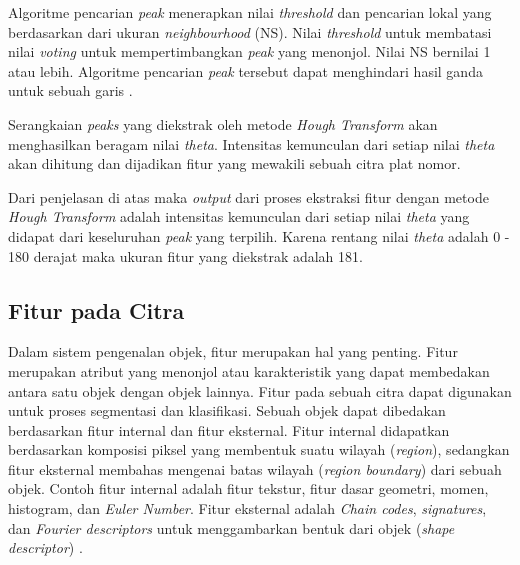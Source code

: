 \noindent Algoritme pencarian \textit{peak} menerapkan nilai \textit{threshold} dan pencarian lokal yang berdasarkan dari ukuran \textit{neighbourhood} (NS). Nilai \textit{threshold} untuk membatasi nilai \textit{voting} untuk mempertimbangkan \textit{peak} yang menonjol. Nilai NS bernilai 1 atau lebih. Algoritme pencarian \textit{peak} tersebut dapat menghindari hasil ganda untuk sebuah garis \cite{oechsle}.

\noindent Serangkaian \textit{peaks} yang diekstrak oleh metode \textit{Hough Transform} akan menghasilkan beragam nilai \textit{theta}. Intensitas kemunculan dari setiap nilai \textit{theta} akan dihitung dan dijadikan fitur yang mewakili sebuah citra plat nomor.

\noindent Dari penjelasan di atas maka \textit{output} dari proses ekstraksi fitur dengan metode \textit{Hough Transform} adalah intensitas kemunculan dari setiap nilai \textit{theta} yang didapat dari keseluruhan \textit{peak} yang terpilih. Karena rentang nilai \textit{theta} adalah 0 - 180 derajat maka ukuran fitur yang diekstrak adalah 181.\\ 

\subsection{Fitur pada Citra}
\noindent Dalam sistem pengenalan objek, fitur merupakan hal yang penting. Fitur merupakan atribut yang menonjol atau karakteristik yang dapat membedakan antara satu objek dengan objek lainnya. Fitur pada sebuah citra dapat digunakan untuk proses segmentasi dan klasifikasi. Sebuah objek dapat dibedakan berdasarkan fitur internal dan fitur eksternal. Fitur internal didapatkan berdasarkan komposisi piksel yang membentuk suatu wilayah (\textit{region}), sedangkan fitur eksternal membahas mengenai batas wilayah (\textit{region boundary}) dari sebuah objek. Contoh fitur internal adalah fitur tekstur, fitur dasar geometri, momen, histogram, dan \textit{Euler Number}. Fitur eksternal adalah \textit{Chain codes}, \textit{signatures}, dan \textit{Fourier descriptors} untuk menggambarkan bentuk dari objek (\textit{shape descriptor}) \cite{gonzalez}.\\

